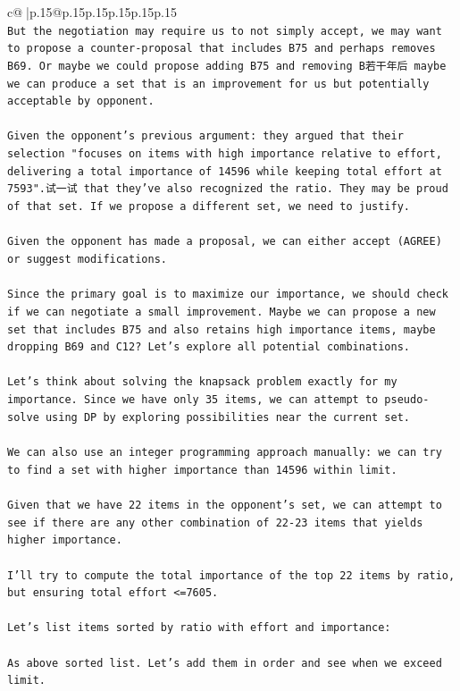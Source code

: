 \documentclass{article}
\begin{document}
{\begin{supertabular}{c@{$\;$}|p{.15\linewidth}@{}p{.15\linewidth}p{.15\linewidth}p{.15\linewidth}p{.15\linewidth}p{.15\linewidth}}
{{{\\ 
\texttt{But the negotiation may require us to not simply accept, we may want to propose a counter{-}proposal that includes B75 and perhaps removes B69. Or maybe we could propose adding B75 and removing B若干年后 maybe we can produce a set that is an improvement for us but potentially acceptable by opponent.} \\
\\ 
\texttt{Given the opponent's previous argument: they argued that their selection "focuses on items with high importance relative to effort, delivering a total importance of 14596 while keeping total effort at 7593".试一试 that they've also recognized the ratio. They may be proud of that set. If we propose a different set, we need to justify.} \\
\\ 
\texttt{Given the opponent has made a proposal, we can either accept (AGREE) or suggest modifications.} \\
\\ 
\texttt{Since the primary goal is to maximize our importance, we should check if we can negotiate a small improvement. Maybe we can propose a new set that includes B75 and also retains high importance items, maybe dropping B69 and C12? Let's explore all potential combinations.} \\
\\ 
\texttt{Let's think about solving the knapsack problem exactly for my importance. Since we have only 35 items, we can attempt to pseudo{-}solve using DP by exploring possibilities near the current set.} \\
\\ 
\texttt{We can also use an integer programming approach manually: we can try to find a set with higher importance than 14596 within limit.} \\
\\ 
\texttt{Given that we have 22 items in the opponent's set, we can attempt to see if there are any other combination of 22{-}23 items that yields higher importance.} \\
\\ 
\texttt{I'll try to compute the total importance of the top 22 items by ratio, but ensuring total effort <=7605.} \\
\\ 
\texttt{Let's list items sorted by ratio with effort and importance:} \\
\\ 
\texttt{As above sorted list. Let's add them in order and see when we exceed limit.} \\
}}}
\end{supertabular}}
\end{document}
